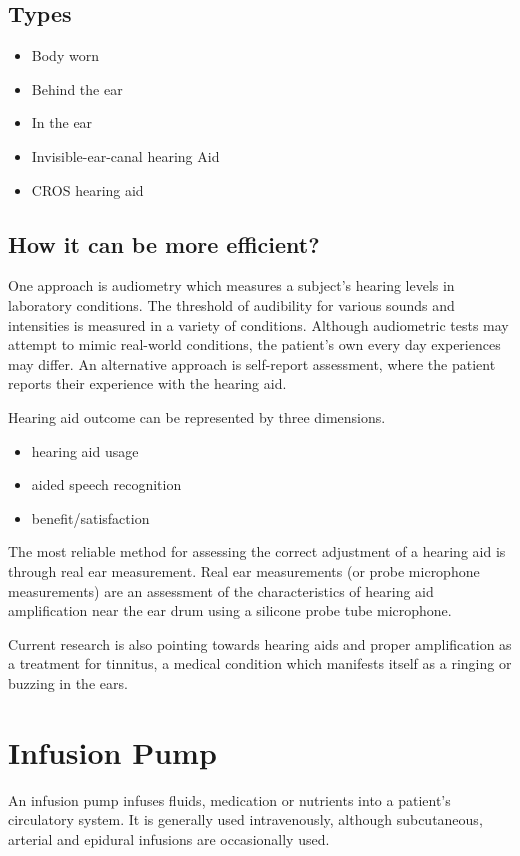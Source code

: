 \documentclass[12pt]{article}
\begin{document}
\subsection{Types}
\begin{itemize}
\item Body worn
\item Behind the ear
\item In the ear
\item Invisible-ear-canal hearing Aid
\item CROS hearing aid
\end{itemize}

\subsection{How it can be more efficient?}
One approach is audiometry which measures a subject's hearing levels in laboratory conditions. The threshold of audibility for various sounds and intensities is measured in a variety of conditions. Although audiometric tests may attempt to mimic real-world conditions, the patient's own every day experiences may differ. An alternative approach is self-report assessment, where the patient reports their experience with the hearing aid.

Hearing aid outcome can be represented by three dimensions.
\begin{itemize}


\item hearing aid usage
\item aided speech recognition
\item benefit/satisfaction
\end{itemize}

The most reliable method for assessing the correct adjustment of a hearing aid is through real ear measurement. Real ear measurements (or probe microphone measurements) are an assessment of the characteristics of hearing aid amplification near the ear drum using a silicone probe tube microphone.

Current research is also pointing towards hearing aids and proper amplification as a treatment for tinnitus, a medical condition which manifests itself as a ringing or buzzing in the ears.
\clearpage


\section{Infusion Pump}
An infusion pump infuses fluids, medication or nutrients into a patient's circulatory system. It is generally used intravenously, although subcutaneous, arterial and epidural infusions are occasionally used.
\end{document}
